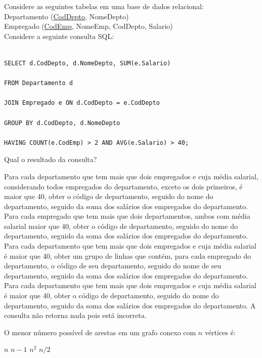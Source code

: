 \documentclass[12pt, addpoints]{exam}
\begin{document}
\begin{questions}
\question

Considere as seguintes tabelas em uma base de dados relacional:\\

Departamento (\underline{CodDepto}, NomeDepto)\\

Empregado (\underline{CodEmp}, NomeEmp, CodDepto, Salario)\\

Considere a seguinte consulta SQL:

\begin{verbatim}

SELECT d.CodDepto, d.NomeDepto, SUM(e.Salario)

FROM Departamento d

JOIN Empregado e ON d.CodDepto = e.CodDepto

GROUP BY d.CodDepto, d.NomeDepto

HAVING COUNT(e.CodEmp) > 2 AND AVG(e.Salario) > 40;

\end{verbatim}



Qual o resultado da consulta?
\begin{choices}
\choice Para cada departamento que tem mais que dois empregados e cuja média salarial, considerando todos empregados do departamento, exceto os dois primeiros, é maior que 40, obter o código de departamento, seguido do nome do departamento, seguido da soma dos salários dos empregados do departamento.
\choice Para cada empregado que tem mais que dois departamentos, ambos com média salarial maior que 40, obter o código de departamento, seguido do nome do departamento, seguido da soma dos salários dos empregados do departamento.
\choice Para cada departamento que tem mais que dois empregados e cuja média salarial é maior que 40, obter um grupo de linhas que contém, para cada empregado do departamento, o código de seu departamento, seguido do nome de seu departamento, seguido da soma dos salários dos empregados do departamento.
\choice Para cada departamento que tem mais que dois empregados e cuja média salarial é maior que 40, obter o código de departamento, seguido do nome do departamento, seguido da soma dos salários dos empregados do departamento.
\choice A consulta não retorna nada pois está incorreta.
\end{choices}

\question

O menor número possível de arestas em um grafo conexo com \( n \) vértices é:
\begin{choices}
\choice \( n \)
\choice \( n - 1 \)
\choice \( n^2 \)
\choice \( n/2 \)
\end{choices}


\end{questions}
\end{document}
